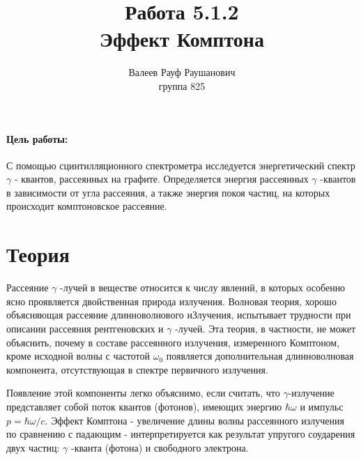 \documentclass[a4paper, 12pt]{article}%
\author{Валеев Рауф Раушанович \\
группа 825}
\title{\textbf{Работа 5.1.2\\
Эффект Комптона}}
\begin{document}
\maketitle
\newpage
\paragraph{Цель работы:} С помощью сцинтилляционного спектрометра исследуется энергетический спектр $\gamma$ - квантов, рассеянных на графите. Определяется энергия рассеянных $\gamma$ -квантов в зависимости от угла рассеяния, а также энергия покоя частиц, на которых происходит комптоновское рассеяние.

\section{Теория}
Рассеяние $\gamma$ -лучей в веществе относится к числу явлений, в которых особенно ясно проявляется двойственная природа излучения. Волновая теория, хорошо объясняющая рассеяние длинноволнового иЗлучения, испытывает трудности при описании рассеяния рентгеновских и $\gamma$ -лучей. Эта теория, в частности, не может объяснить, почему в составе рассеянного излучения, измеренного Комптоном, кроме исходной волны с частотой $\omega_{0}$ появляется дополнительная длинноволновая компонента, отсутствующая в спектре первичного излучения.

Появление этой компоненты легко объяснимо, если считать, что $\gamma$-излучение представляет собой поток квантов (фотонов), имеющих энергию $\hbar \omega$ и импульс $p=\hbar \omega / c .$ Эффект Комптона - увеличение длины волны рассеянного излучения по сравнению с падающим - интерпретируется как результат упругого соударения двух частиц: $\gamma$ -кванта (фотона) и свободного электрона.
\end{document}
